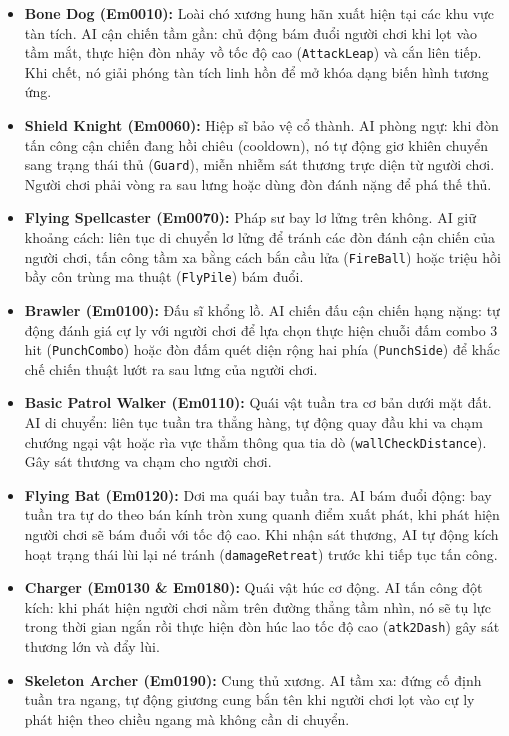 \documentclass[../DoAn.tex]{subfiles}
\begin{document}
\begin{itemize}
    \item \textbf{Bone Dog (Em0010):} Loài chó xương hung hãn xuất hiện tại các khu vực tàn tích. AI cận chiến tầm gần: chủ động bám đuổi người chơi khi lọt vào tầm mắt, thực hiện đòn nhảy vồ tốc độ cao (\texttt{AttackLeap}) và cắn liên tiếp. Khi chết, nó giải phóng tàn tích linh hồn để mở khóa dạng biến hình tương ứng.
    \item \textbf{Shield Knight (Em0060):} Hiệp sĩ bảo vệ cổ thành. AI phòng ngự: khi đòn tấn công cận chiến đang hồi chiêu (cooldown), nó tự động giơ khiên chuyển sang trạng thái thủ (\texttt{Guard}), miễn nhiễm sát thương trực diện từ người chơi. Người chơi phải vòng ra sau lưng hoặc dùng đòn đánh nặng để phá thế thủ.
    \item \textbf{Flying Spellcaster (Em0070):} Pháp sư bay lơ lửng trên không. AI giữ khoảng cách: liên tục di chuyển lơ lửng để tránh các đòn đánh cận chiến của người chơi, tấn công tầm xa bằng cách bắn cầu lửa (\texttt{FireBall}) hoặc triệu hồi bầy côn trùng ma thuật (\texttt{FlyPile}) bám đuổi.
    \item \textbf{Brawler (Em0100):} Đấu sĩ khổng lồ. AI chiến đấu cận chiến hạng nặng: tự động đánh giá cự ly với người chơi để lựa chọn thực hiện chuỗi đấm combo 3 hit (\texttt{PunchCombo}) hoặc đòn đấm quét diện rộng hai phía (\texttt{PunchSide}) để khắc chế chiến thuật lướt ra sau lưng của người chơi.
    \item \textbf{Basic Patrol Walker (Em0110):} Quái vật tuần tra cơ bản dưới mặt đất. AI di chuyển: liên tục tuần tra thẳng hàng, tự động quay đầu khi va chạm chướng ngại vật hoặc rìa vực thẳm thông qua tia dò (\texttt{wallCheckDistance}). Gây sát thương va chạm cho người chơi.
    \item \textbf{Flying Bat (Em0120):} Dơi ma quái bay tuần tra. AI bám đuổi động: bay tuần tra tự do theo bán kính tròn xung quanh điểm xuất phát, khi phát hiện người chơi sẽ bám đuổi với tốc độ cao. Khi nhận sát thương, AI tự động kích hoạt trạng thái lùi lại né tránh (\texttt{damageRetreat}) trước khi tiếp tục tấn công.
    \item \textbf{Charger (Em0130 \& Em0180):} Quái vật húc cơ động. AI tấn công đột kích: khi phát hiện người chơi nằm trên đường thẳng tầm nhìn, nó sẽ tụ lực trong thời gian ngắn rồi thực hiện đòn húc lao tốc độ cao (\texttt{atk2Dash}) gây sát thương lớn và đẩy lùi.
    \item \textbf{Skeleton Archer (Em0190):} Cung thủ xương. AI tầm xa: đứng cố định tuần tra ngang, tự động giương cung bắn tên khi người chơi lọt vào cự ly phát hiện theo chiều ngang mà không cần di chuyển.

\end{itemize}
\end{document}
